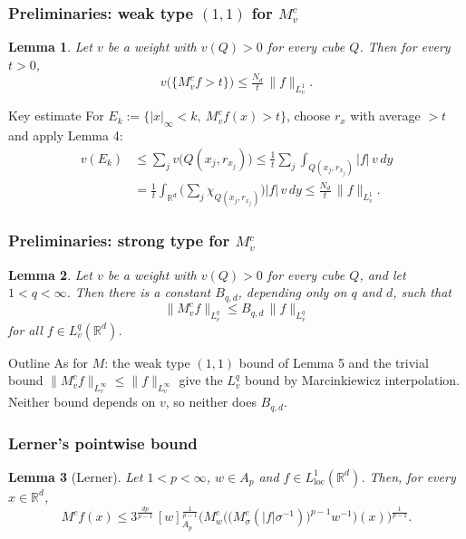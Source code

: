 \documentclass[aspectratio=1610]{beamer}
\newtheorem{lem}{Lemma} %
\begin{document}
\begin{frame}
  \frametitle{Preliminaries: weak type $(1,1)$ for $M^c_v$}
\begin{lem}
Let $v$ be a weight with $v(Q) > 0$ for every cube $Q$. Then for every $t > 0$,
\[
  v\big(\{M^c_v f > t\}\big) \le \tfrac{N_d}{t}\, \|f\|_{L^1_v} .
\]
\end{lem}
\pause
\vspace{-0.8em}
\begin{block}{Key estimate}
\small
For $E_k := \{|x|_\infty < k,\ M^c_v f(x) > t\}$, choose $r_x$ with average $> t$ and apply Lemma 4:
\vspace{-0.4em}
\begin{align*}
  v(E_k) &\le \sum_j v\big(Q(x_j, r_{x_j})\big) \le \frac{1}{t} \sum_j \int_{Q(x_j, r_{x_j})} |f|\, v\,dy \\
  &= \frac{1}{t} \int_{\mathbb{R}^d} \Big( \sum_j \chi_{Q(x_j, r_{x_j})} \Big) |f|\, v\,dy \le \frac{N_d}{t}\, \|f\|_{L^1_v} .
\end{align*}
\end{block}
\end{frame}

\begin{frame}
  \frametitle{Preliminaries: strong type for $M^c_v$}
\begin{lem}
Let $v$ be a weight with $v(Q) > 0$ for every cube $Q$, and let $1 < q < \infty$. Then there is a constant $B_{q,d}$, depending only on $q$ and $d$, such that
\[
  \|M^c_v f\|_{L^q_v} \le B_{q,d}\, \|f\|_{L^q_v}
\]
for all $f \in L^q_v(\mathbb{R}^d)$.
\end{lem}
\pause
\begin{block}{Outline}
As for $M$: the weak type $(1,1)$ bound of Lemma 5 and the trivial bound $\|M^c_v f\|_{L^\infty_v} \le \|f\|_{L^\infty_v}$ give the $L^q_v$ bound by Marcinkiewicz interpolation. Neither bound depends on $v$, so neither does $B_{q,d}$.
\end{block}
\end{frame}

\begin{frame}
  \frametitle{Lerner's pointwise bound}
\begin{lem}[Lerner]
Let $1 < p < \infty$, $w \in A_p$ and $f \in L^1_{\mathrm{loc}}(\mathbb{R}^d)$. Then, for every $x \in \mathbb{R}^d$,
\[
  M^c f(x) \le 3^{\frac{dp}{p-1}}\, [w]_{A_p}^{\frac{1}{p-1}} \Big( M^c_w\Big( \big(M^c_\sigma(|f|\sigma^{-1})\big)^{p-1} w^{-1} \Big)(x) \Big)^{\frac{1}{p-1}} .
\]
\end{lem}
\end{frame}
\end{document}
